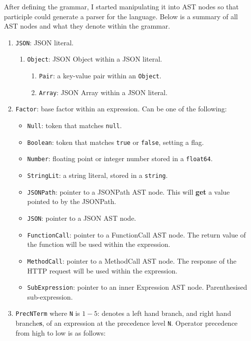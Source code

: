 After defining the grammar, I started manipulating it into AST nodes so that participle could generate a parser for the language. Below is a summary of all AST nodes and what they denote within the grammar.

\begin{enumerate}
    \item \verb|JSON|: JSON literal.
    \begin{enumerate}
        \item \verb|Object|: JSON Object within a JSON literal.
        \begin{enumerate}
            \item \verb|Pair|: a key-value pair within an \verb|Object|.
        \item \verb|Array|: JSON Array within a JSON literal.
        \end{enumerate}
    \end{enumerate}
    \item \verb|Factor|: base factor within an expression. Can be one of the following:
    \begin{itemize}
        \item \verb|Null|: token that matches \verb|null|.
        \item \verb|Boolean|: token that matches \verb|true| or \verb|false|, setting a flag.
        \item \verb|Number|: floating point or integer number stored in a \texttt{float64}.
        \item \verb|StringLit|: a string literal, stored in a \texttt{string}.
        \item \verb|JSONPath|: pointer to a JSONPath AST node. This will \textbf{get} a value pointed to by the JSONPath.
        \item \verb|JSON|: pointer to a JSON AST node.
        \item \verb|FunctionCall|: pointer to a FunctionCall AST node. The return value of the function will be used within the expression.
        \item \verb|MethodCall|: pointer to a MethodCall AST node. The response of the HTTP request will be used within the expression.
        \item \verb|SubExpression|: pointer to an inner Expression AST node. Parenthesised sub-expression.
    \end{itemize}
    \item \verb|PrecNTerm| where \verb|N| is $1-5$: denotes a left hand branch, and right hand branche\textbf{s}, of an expression at the precedence level \verb|N|. Operator precedence from high to low is as follows:

\end{enumerate}
